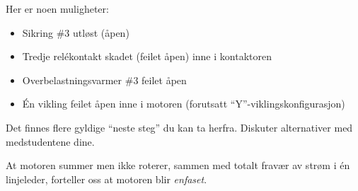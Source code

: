 





Her er noen muligheter:

\begin{itemize}
\item{} Sikring \#3 utløst (åpen)
\item{} Tredje relékontakt skadet (feilet åpen) inne i kontaktoren
\item{} Overbelastningsvarmer \#3 feilet åpen
\item{} Én vikling feilet åpen inne i motoren (forutsatt ``Y''-viklingskonfigurasjon)
\end{itemize}

Det finnes flere gyldige ``neste steg'' du kan ta herfra. Diskuter alternativer med medstudentene dine.







At motoren summer men ikke roterer, sammen med totalt fravær av strøm i én linjeleder, forteller oss at motoren blir {\it enfaset}.



